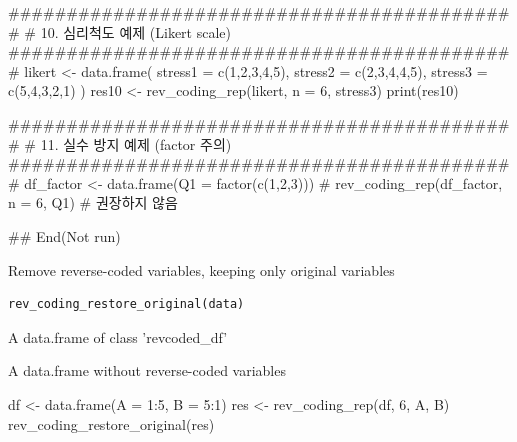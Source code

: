 \documentclass[a4paper]{book}
\begin{document}
\begin{Examples}
\begin{ExampleCode}
############################################
# 10. 심리척도 예제 (Likert scale)
############################################
likert <- data.frame(
  stress1 = c(1,2,3,4,5),
  stress2 = c(2,3,4,4,5),
  stress3 = c(5,4,3,2,1)
)
res10 <- rev_coding_rep(likert, n = 6, stress3)
print(res10)

############################################
# 11. 실수 방지 예제 (factor 주의)
############################################
df_factor <- data.frame(Q1 = factor(c(1,2,3)))
# rev_coding_rep(df_factor, n = 6, Q1)  # 권장하지 않음

## End(Not run)
\end{ExampleCode}
\end{Examples}

%
\begin{Description}
Remove reverse-coded variables, keeping only original variables
\end{Description}
%
\begin{Usage}
\begin{verbatim}
rev_coding_restore_original(data)
\end{verbatim}
\end{Usage}
%
\begin{Arguments}
\begin{ldescription}
\item[\code{data}] A data.frame of class 'revcoded\_df'
\end{ldescription}
\end{Arguments}
%
\begin{Value}
A data.frame without reverse-coded variables
\end{Value}
%
\begin{Examples}
\begin{ExampleCode}
df <- data.frame(A = 1:5, B = 5:1)
res <- rev_coding_rep(df, 6, A, B)
rev_coding_restore_original(res)
\end{ExampleCode}
\end{Examples}
\end{document}
